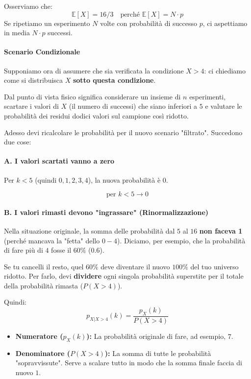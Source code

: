 Osserviamo che:
\[ \mathbb{E}[X] = 16/3 \quad \text{perché } \mathbb{E}[X] = N \cdot p \]
Se ripetiamo un esperimento $N$ volte con probabilità di successo $p$, ci aspettiamo in media $N \cdot p$ successi.

\paragraph{Scenario Condizionale}
Supponiamo ora di assumere che sia verificata la condizione $X > 4$: ci chiediamo come si distribuisca $X$ \textbf{sotto questa condizione}.

Dal punto di vista fisico significa considerare un insieme di $n$ esperimenti, scartare i valori di $X$ (il numero di successi) che siano inferiori a $5$ e valutare le probabilità dei residui dodici valori sul campione così ridotto.

Adesso devi ricalcolare le probabilità per il nuovo scenario "filtrato". Succedono due cose:

\paragraph{A. I valori scartati vanno a zero}

Per $k < 5$ (quindi $0, 1, 2, 3, 4$), la nuova probabilità è $0$.

\[ \text{per } k < 5 \to 0 \]

\paragraph{B. I valori rimasti devono "ingrassare" (Rinormalizzazione)}


Nella situazione originale, la somma delle probabilità dal $5$ al $16$ \textbf{non faceva 1} (perché mancava la "fetta" dello $0-4$). Diciamo, per esempio, che la probabilità di fare più di $4$ fosse il $60\%$ ($0.6$).

Se tu cancelli il resto, quel $60\%$ deve diventare il nuovo $100\%$ del tuo universo ridotto.
Per farlo, devi \textbf{dividere} ogni singola probabilità superstite per il totale della probabilità rimasta ($P(X > 4)$).

Quindi:
\begin{equation}
p_{X|X>4}(k) = \frac{p_X(k)}{P(X > 4)}
\end{equation}

\begin{itemize}
    \item \textbf{Numeratore ($p_X(k)$):} La probabilità originale di fare, ad esempio, $7$.
    \item \textbf{Denominatore ($P(X > 4)$):} La somma di tutte le probabilità "sopravvissute". Serve a scalare tutto in modo che la somma finale faccia di nuovo $1$.
\end{itemize}

